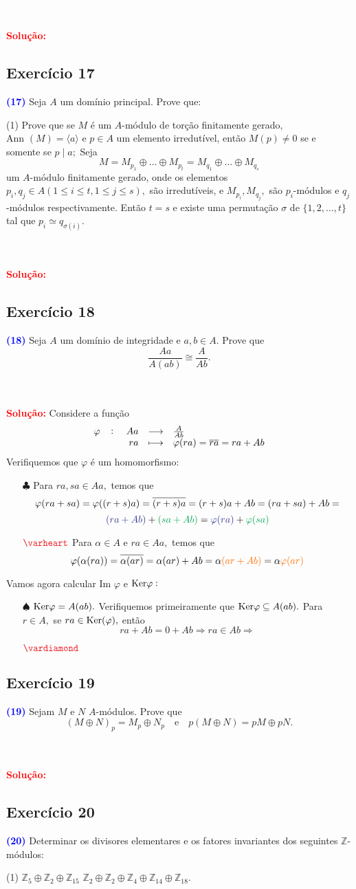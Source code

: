 \documentclass[11pt,a4paper]{article}
\newcommand{\exercicio}[1]{\subsection{Exercício #1} \textcolor{blue}{\bf(#1)}}
\newcommand{\dividiritens}[1]{\begin{tasks}[counter-format={(tsk[a])},label-width=3.6ex, label-format = {\bfseries}, column-sep = {0pt}](1) #1 \end{tasks}}
\newcommand{\pers}[1]{\textcolor{Floresta}{$\negrito{(#1)} $}}
\newcommand{\solucao}[1]{
\textbf{\textcolor{white}{oi}\\ \\ \textcolor{red}{Solução:}} #1}
\begin{document}
\solucao{}
\exercicio{17} Seja $A$ um domínio principal. Prove que:
\dividiritens{
\task[\pers{a}]  Prove que se $M$ é um $A$-módulo de torção finitamente gerado, $\mbox{Ann } (M) = \langle a \rangle$ e $p \in A$ um elemento irredutível, então $M(p) \neq 0$ se e somente se $p \mid a;$
\task[\pers{b}] Seja
\[
M = M_{p_1} \oplus \ldots \oplus M_{p_t} = M_{q_1} \oplus \ldots \oplus M_{q_s} 
\]
um $A$-módulo finitamente gerado, onde os elementos $p_i, q_j \in A (1 \le i \le t, 1 \le j \le s),$ são irredutíveis, e $M_{p_i}, M_{q_j},$ são $p_i$-módulos e $q_j$-módulos respectivamente. Então $t = s$ e existe uma permutação $\sigma$ de $\{ 1, 2, \ldots, t \}$ tal que $p_i \simeq q_{\sigma(i)}.$
}
\solucao{}
\exercicio{18} Seja $A$ um domínio de integridade e $a, b \in A.$ Prove que 
\[\frac{Aa}{A(ab)} \cong \frac{A}{Ab}.\]
\solucao{
Considere a função
\[
\fullfunction{\varphi}{Aa}{\frac{A}{Ab}}{ra}{\varphi(ra) = \overline{ra} = ra + Ab}
\]
Verifiquemos que $\varphi$ é um homomorfismo:
\begin{itemize}
    \item[$\clubsuit$] Para $ra, sa \in Aa,$ temos que
    \[
    \varphi(ra + sa) = \varphi((r+s)a) = \overline{(r+s)a} = (r+s)a + Ab = (ra + sa) + Ab = \]\[\textcolor{Blue}{(ra + Ab)} + \textcolor{Green}{(sa + Ab)} = \textcolor{Blue}{\varphi(ra)} + \textcolor{Green}{\varphi(sa)}
    \]
    \item[$\textcolor{Red}{\varheart}$] Para $\alpha \in A$ e $ra \in Aa,$ temos que
    \[
    \varphi(\alpha(ra)) = \overline{\alpha (ar)} = \alpha (ar) + Ab = \alpha \textcolor{Laranja}{(ar + Ab)} = \alpha  \textcolor{Laranja}{\varphi(ar)}
    \]
\end{itemize}
Vamos agora calcular $\mbox{Im } \varphi$ e ${\rm Ker} \varphi :$
\begin{itemize}
    \item[$\spadesuit$] ${\rm Ker} \varphi = A(ab).$ Verifiquemos primeiramente que ${\rm Ker} \varphi \subseteq A(ab).$ Para $r \in A,$ se $ra \in {\rm Ker}(\varphi),$ então 
    \[
    ra + Ab = 0 + Ab \Rightarrow ra \in Ab \Rightarrow
    \]
    
    \item[$\textcolor{Red}{\vardiamond}$]
\end{itemize}
}
\exercicio{19} Sejam $M$ e $N$ $A$-módulos. Prove que
\[
(M \oplus N)_p = M_p \oplus N_p \quad \mbox{e} \quad p(M \oplus N) = pM \oplus pN.
\]
\solucao{}
\exercicio{20}  Determinar os divisores elementares e os fatores invariantes dos seguintes $\mathbb{Z}$-módulos:
\dividiritens{
\task[\pers{a}] $\mathbb{Z}_5 \oplus \mathbb{Z}_2 \oplus \mathbb{Z}_{15}$
\task[\pers{b}] $\mathbb{Z}_2 \oplus \mathbb{Z}_2 \oplus \mathbb{Z}_{4} \oplus \mathbb{Z}_{14} \oplus \mathbb{Z}_{18}.$
}
\end{document}
